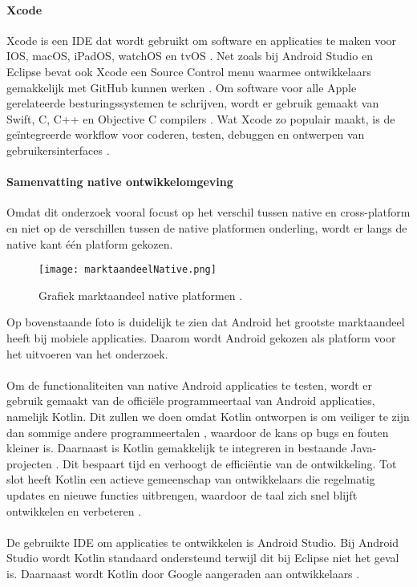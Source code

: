\paragraph{Xcode}
Xcode is een IDE dat wordt gebruikt om software en applicaties te maken voor IOS, macOS, 
iPadOS, watchOS en tvOS \autocite{jahnavisarora2020}. Net zoals bij Android Studio en 
Eclipse bevat ook Xcode een Source Control menu waarmee ontwikkelaars gemakkelijk met GitHub 
kunnen werken \autocite{Medewar2022}. Om software voor alle Apple gerelateerde besturingssystemen 
te schrijven, wordt er gebruik gemaakt van Swift, C, C++ en Objective C compilers 
\autocite{jahnavisarora2020}. Wat Xcode zo populair maakt, is de geïntegreerde workflow 
voor coderen, testen, debuggen en ontwerpen van gebruikersinterfaces \autocite{jahnavisarora2020}.

\paragraph{Samenvatting native ontwikkelomgeving}
Omdat dit onderzoek vooral focust op het verschil tussen native en cross-platform en niet 
op de verschillen tussen de native platformen onderling, wordt er langs de native kant één platform gekozen.
\begin{figure}[H]
    \centering
    \texttt{[image: marktaandeelNative.png]}
    \caption{Grafiek marktaandeel native platformen \parencite{Monus2023}.}
\end{figure}
Op bovenstaande foto is duidelijk te zien dat Android het grootste marktaandeel heeft bij mobiele 
applicaties. Daarom wordt Android gekozen als platform voor het uitvoeren van het onderzoek.
\\\\
Om de functionaliteiten van native Android applicaties 
te testen, wordt er gebruik gemaakt van de officiële programmeertaal van Android applicaties, 
namelijk Kotlin. Dit zullen we doen omdat Kotlin ontworpen is om veiliger te zijn dan 
sommige andere programmeertalen \autocite{Kesavan2021}, waardoor de kans op bugs en 
fouten kleiner is. Daarnaast is Kotlin gemakkelijk te integreren in bestaande 
Java-projecten \autocite{Kesavan2021}. Dit bespaart tijd en verhoogt de efficiëntie 
van de ontwikkeling. Tot slot heeft Kotlin een actieve gemeenschap van ontwikkelaars 
die regelmatig updates en nieuwe functies uitbrengen, waardoor de taal zich snel blijft 
ontwikkelen en verbeteren \autocite{Patel2023}.
\\\\
De gebruikte IDE om applicaties te ontwikkelen is Android Studio. Bij Android Studio wordt 
Kotlin standaard ondersteund terwijl dit bij Eclipse niet het geval is. Daarnaast wordt Kotlin 
door Google aangeraden aan ontwikkelaars \autocite{Medewar2022}.

